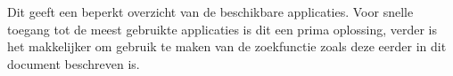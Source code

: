 Dit geeft een beperkt overzicht van de beschikbare applicaties. Voor snelle toegang tot de meest gebruikte applicaties
is dit een prima oplossing, verder is het makkelijker om gebruik te maken van de zoekfunctie zoals deze eerder in dit
document beschreven is.


